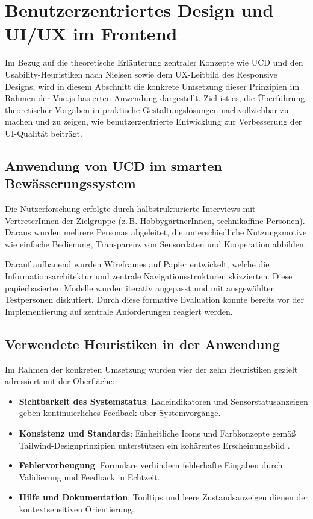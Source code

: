 \section{Benutzerzentriertes Design und UI/UX im Frontend}

Im Bezug auf die theoretische Erläuterung zentraler Konzepte wie \ac{UCD} und den Usability-Heuristiken nach Nielsen sowie dem \ac{UX}-Leitbild des Responsive Designs, wird in diesem Abschnitt die konkrete Umsetzung dieser Prinzipien im Rahmen der Vue.js-basierten Anwendung dargestellt. Ziel ist es, die Überführung theoretischer Vorgaben in praktische Gestaltungslösungen nachvollziehbar zu machen und zu zeigen, wie benutzerzentrierte Entwicklung zur Verbesserung der \ac{UI}-Qualität beiträgt.

\subsection{Anwendung von UCD im smarten Bewässerungssystem}

Die Nutzerforschung erfolgte durch halbstrukturierte Interviews mit VertreterInnen der Zielgruppe (z.\,B. HobbygärtnerInnen, technikaffine Personen). Daraus wurden mehrere Personas abgeleitet, die unterschiedliche Nutzungsmotive wie einfache Bedienung, Transparenz von Sensordaten und Kooperation abbilden. 

Darauf aufbauend wurden Wireframes auf Papier entwickelt, welche die Informationsarchitektur und zentrale Navigationsstrukturen skizzierten. Diese papierbasierten Modelle wurden iterativ angepasst und mit ausgewählten Testpersonen diskutiert. Durch diese formative Evaluation konnte bereits vor der Implementierung auf zentrale Anforderungen reagiert werden.

\subsection{Verwendete Heuristiken in der Anwendung}

Im Rahmen der konkreten Umsetzung wurden vier der zehn Heuristiken gezielt adressiert mit der Oberfläche:
\begin{itemize}
	\item \textbf{Sichtbarkeit des Systemstatus}: Ladeindikatoren und Sensorstatusanzeigen geben kontinuierliches Feedback über Systemvorgänge.
	\item \textbf{Konsistenz und Standards}: Einheitliche Icons und Farbkonzepte gemäß Tailwind-Designprinzipien unterstützen ein kohärentes Erscheinungsbild \cite{TailwindCSS}.
	\item \textbf{Fehlervorbeugung}: Formulare verhindern fehlerhafte Eingaben durch Validierung und Feedback in Echtzeit.
	\item \textbf{Hilfe und Dokumentation}: Tooltips und leere Zustandsanzeigen dienen der kontextsensitiven Orientierung.
\end{itemize}

